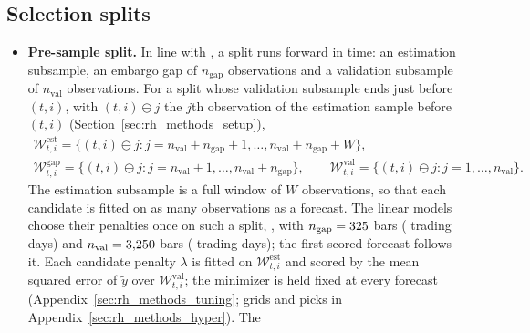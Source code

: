\subsection{Selection splits}
\label{app:rh_methods_splits}
\begin{itemize}
\item \textbf{Pre-sample split.} In line with \citet{gu2020empirical}, a split runs forward in time: an estimation
  subsample, an embargo gap of $n_{\mathrm{gap}}$ observations and a validation subsample of $n_{\mathrm{val}}$
  observations. For a split whose validation subsample ends just before $(t,i)$, with $(t,i) \ominus j$ the $j$th
  observation of the estimation sample before $(t,i)$ (Section~\ref{sec:rh_methods_setup}),
  \begin{gather*}
    \mathcal W^{\mathrm{est}}_{t,i} = \{(t,i) \ominus j : j = n_{\mathrm{val}} + n_{\mathrm{gap}} + 1, \dots,
      n_{\mathrm{val}} + n_{\mathrm{gap}} + W\}, \\
    \mathcal W^{\mathrm{gap}}_{t,i} = \{(t,i) \ominus j : j = n_{\mathrm{val}} + 1, \dots,
      n_{\mathrm{val}} + n_{\mathrm{gap}}\}, \qquad
    \mathcal W^{\mathrm{val}}_{t,i} = \{(t,i) \ominus j : j = 1, \dots, n_{\mathrm{val}}\}.
  \end{gather*}
  The estimation subsample is a full window of $W$ observations, so that each candidate is fitted on as many
  observations as a forecast. The linear models choose their penalties once on such a split, \rhorPenSample,
  with $n_{\mathrm{gap}} = 325$ bars (\rhdmPlPreEmbargoSess{} trading days) and
  $n_{\mathrm{val}} = 3{,}250$ bars (\rhdmPlPreFoldSess{} trading days); the first scored forecast follows
  it. Each candidate penalty $\lambda$ is fitted on $\mathcal W^{\mathrm{est}}_{t,i}$ and scored by the mean squared
  error of $\tilde y$ over $\mathcal W^{\mathrm{val}}_{t,i}$; the minimizer is held fixed at every forecast
  (Appendix~\ref{sec:rh_methods_tuning}; grids and picks in Appendix~\ref{sec:rh_methods_hyper}). The

\end{itemize}
